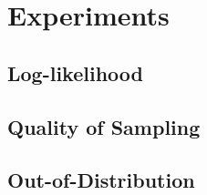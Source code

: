 \section{Experiments}

\subsection{Log-likelihood}


\subsection{Quality of Sampling}


\subsection{Out-of-Distribution}